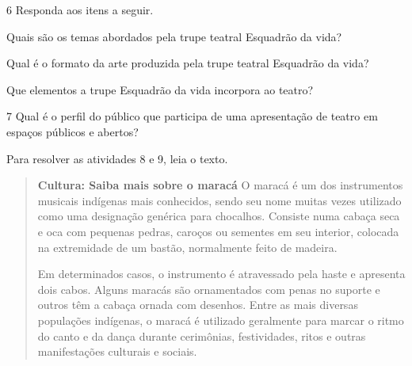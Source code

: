 \num{6}  Responda aos itens a seguir.

\begin{escolha}
\item Quais são os temas abordados pela trupe teatral Esquadrão da vida?


\item Qual é o formato da arte produzida pela trupe teatral Esquadrão da vida?


\item Que elementos a trupe Esquadrão da vida incorpora ao teatro?


\num{7} Qual é o perfil do público que participa de uma apresentação de teatro em espaços públicos e abertos?



Para resolver as atividades 8 e 9, leia o texto.

%

\begin{quote}
\textbf{Cultura: Saiba mais sobre o maracá}
O maracá é um dos instrumentos musicais indígenas mais conhecidos, sendo
seu nome muitas vezes utilizado como uma designação genérica para
chocalhos. Consiste numa cabaça seca e oca com pequenas pedras, caroços
ou sementes em seu interior, colocada na extremidade de um bastão,
normalmente feito de madeira.

Em determinados casos, o instrumento é atravessado pela haste e
apresenta dois cabos. Alguns maracás são ornamentados com penas no
suporte e outros têm a cabaça ornada com desenhos. Entre as mais
diversas populações indígenas, o maracá é utilizado geralmente para
marcar o ritmo do canto e da dança durante cerimônias, festividades,
ritos e outras manifestações culturais e sociais.


\end{quote}
\end{escolha}
